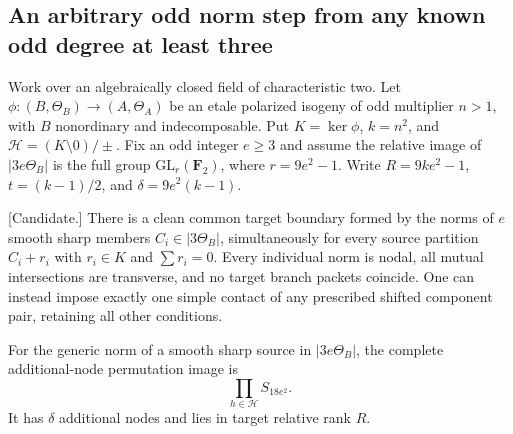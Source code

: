 \subsection{An arbitrary odd norm step from any known odd degree at least three}
\label{subsec:cubic-component-norm-transfer-candidate}

Work over an algebraically closed field of characteristic two. Let
$\phi:(B,\Theta_B)\to(A,\Theta_A)$ be an etale polarized isogeny
of odd multiplier $n>1$, with $B$ nonordinary and indecomposable.
Put $K=\ker\phi$, $k=n^2$, and $\mathcal H=(K\setminus0)/\pm$.
Fix an odd integer $e\ge3$ and assume the relative image of
$|3e\Theta_B|$ is the full group $\mathrm{GL}_r(\mathbf F_2)$,
where $r=9e^2-1$. Write $R=9ke^2-1$, $t=(k-1)/2$, and
$\delta=9e^2(k-1)$.

\begin{lemma}
\label{lem:cubic-component-clean-node-product-candidate}
\textup{[Candidate.]}
There is a clean common target boundary formed by the norms of
$e$ smooth sharp members $C_i\in|3\Theta_B|$, simultaneously for
every source partition $C_i+r_i$ with $r_i\in K$ and $\sum r_i=0$.
Every individual norm is nodal, all mutual intersections are
transverse, and no target branch packets coincide. One can instead
impose exactly one simple contact of any prescribed shifted
component pair, retaining all other conditions.

For the generic norm of a smooth sharp source in $|3e\Theta_B|$,
the complete additional-node permutation image is
\[
                         \prod_{h\in\mathcal H}S_{18e^2}.
\]
It has $\delta$ additional nodes and lies in target relative rank $R$.
\end{lemma}


